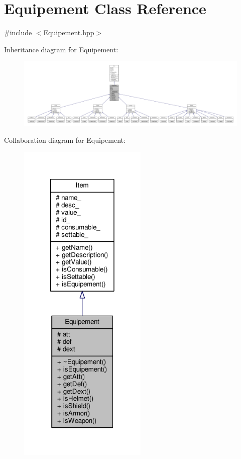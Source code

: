 \hypertarget{class_equipement}{\section{Equipement Class Reference}
\label{class_equipement}
}


{\ttfamily \#include $<$Equipement.\-hpp$>$}



Inheritance diagram for Equipement\-:
\nopagebreak
\begin{figure}[H]
\begin{center}
\leavevmode
\includegraphics[width=350pt]{class_equipement__inherit__graph}
\end{center}
\end{figure}


Collaboration diagram for Equipement\-:\nopagebreak
\begin{figure}[H]
\begin{center}
\leavevmode
\includegraphics[width=174pt]{class_equipement__coll__graph}
\end{center}
\end{figure}
